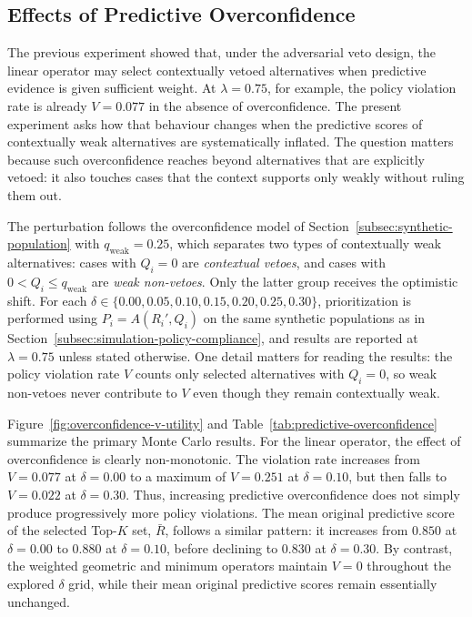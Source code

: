 \documentclass[mathematics,article,submit,moreauthors]{Definitions/mdpi}
\begin{document}

\subsection{Effects of Predictive Overconfidence}
\label{subsec:simulation-predictive-overconfidence}

The previous experiment showed that, under the adversarial veto design,
the linear operator may select contextually vetoed alternatives when
predictive evidence is given sufficient weight. At $\lambda=0.75$, for
example, the policy violation rate is already $V=0.077$ in the absence
of overconfidence. {\color{teal}The present experiment asks how that
behaviour changes when the predictive scores of contextually weak
alternatives are systematically inflated. The question matters because such
overconfidence reaches beyond alternatives that are explicitly vetoed: it
also touches cases that the context supports only weakly without ruling
them out.}

{\color{teal}The perturbation follows the overconfidence model of
Section~\ref{subsec:synthetic-population} with $q_{\mathrm{weak}}=0.25$,
which separates two types of contextually weak alternatives: cases with
$Q_i=0$ are \emph{contextual vetoes}, and cases with
$0<Q_i\le q_{\mathrm{weak}}$ are \emph{weak non-vetoes}. Only the latter
group receives the optimistic shift. For each
$\delta\in\{0.00,0.05,0.10,0.15,0.20,0.25,0.30\}$, prioritization is
performed using $P_i=A(R_i',Q_i)$ on the same synthetic populations as in
Section~\ref{subsec:simulation-policy-compliance}, and results are reported
at $\lambda=0.75$ unless stated otherwise. One detail matters for reading
the results: the policy violation rate $V$ counts only selected
alternatives with $Q_i=0$, so weak non-vetoes never contribute to $V$ even
though they remain contextually weak.}

Figure~\ref{fig:overconfidence-v-utility} and
Table~\ref{tab:predictive-overconfidence} summarize the primary Monte
Carlo results. For the linear operator, the effect of overconfidence is
clearly non-monotonic. The violation rate increases from $V=0.077$ at
$\delta=0.00$ to a maximum of $V=0.251$ at $\delta=0.10$, but then falls
to $V=0.022$ at $\delta=0.30$. Thus, increasing predictive overconfidence
does not simply produce progressively more policy violations. The mean
original predictive score of the selected Top-$K$ set, $\bar{R}$, follows
a similar pattern: it increases from $0.850$ at $\delta=0.00$ to
$0.880$ at $\delta=0.10$, before declining to $0.830$ at
$\delta=0.30$. By contrast, the weighted geometric and minimum operators
maintain $V=0$ throughout the explored $\delta$ grid, while their mean
original predictive scores remain essentially unchanged.
\end{document}
